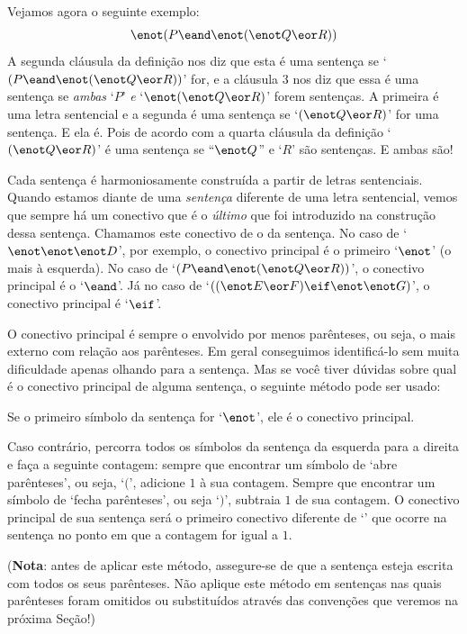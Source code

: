 Vejamos agora o seguinte exemplo:
$$\enot (P \eand \enot (\enot Q \eor R))$$
A segunda cláusula da definição nos diz que esta é uma sentença se `$(P \eand \enot (\enot Q \eor R))$' for, e a cláusula 3 nos diz que essa é uma sentença se \emph{ambas} `$P$' \emph{e} `$\enot (\enot Q \eor R)$' forem sentenças.
A primeira é uma letra sentencial e a segunda é uma sentença se `$(\enot Q \eor R)$' for uma sentença.
E ela é.
Pois de acordo com a quarta cláusula da definição `$(\enot Q \eor R)$' é uma sentença se ``$\enot Q$'' e `$R$' são sentenças. E ambas são!

Cada sentença é harmoniosamente construída a partir de letras sentenciais.
Quando estamos diante de uma \emph{sentença} diferente de uma letra sentencial, vemos que sempre há um conectivo que é o \emph{último} que foi introduzido na construção dessa sentença.
Chamamos este conectivo de o  da sentença.
No caso de `$\enot\enot\enot D$', por exemplo, o conectivo principal é o primeiro `$\enot$' (o mais à esquerda).
No caso de `$(P \eand \enot (\enot Q \eor R))$', o conectivo principal é o `$\eand$'.
Já no caso de `$((\enot E \eor F) \eif \enot\enot G)$', o conectivo principal  é `$\eif$'.

O conectivo principal é sempre o envolvido por menos parênteses, ou seja, o mais externo com relação aos parênteses.
Em geral conseguimos identificá-lo sem muita dificuldade apenas olhando para a sentença.
Mas se você tiver dúvidas sobre qual é o conectivo principal de alguma sentença, o seguinte método pode ser usado:
\begin{ebullet}
	\item Se o primeiro símbolo da sentença for `$\enot$', ele é o conectivo principal.
	\item  Caso contrário, percorra todos os símbolos da sentença da esquerda para a direita e faça a seguinte contagem: sempre que encontrar um símbolo de `abre parênteses', ou seja, `$($', adicione $1$ à sua contagem. Sempre que encontrar um símbolo de `fecha parênteses', ou seja `$)$', subtraia $1$ de sua contagem. O conectivo principal de sua sentença será o primeiro conectivo diferente de `\enot' que ocorre na sentença no ponto em que a contagem for igual a $1$.
\end{ebullet}

\noindent (\textbf{Nota}: antes de aplicar este método, assegure-se de que a sentença esteja escrita com todos os seus parênteses.
Não aplique este método em sentenças nas quais parênteses foram omitidos ou substituídos através das convenções que veremos na próxima Seção!)

